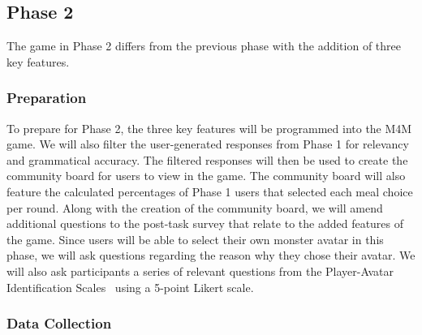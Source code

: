 \subsection{Phase 2}

The game in Phase 2 differs from the previous phase with the addition of three key features.


\subsubsection{Preparation}

To prepare for Phase 2, the three key features will be programmed into the M4M game.
We will also filter the user-generated responses from Phase 1 for relevancy and grammatical accuracy. 
The filtered responses will then be used to create the community board for users to view in the game. 
The community board will also feature the calculated percentages of Phase 1 users that selected each meal choice per round.
Along with the creation of the community board, we will amend additional questions to the post-task survey that relate to the added features of the game. 
Since users will be able to select their own monster avatar in this phase, we will ask questions regarding the reason why they chose their avatar. 
We will also ask participants a series of relevant questions from the Player-Avatar Identification Scales~\cite{li2013player} using a 5-point Likert scale. 

\subsubsection{Data Collection}


